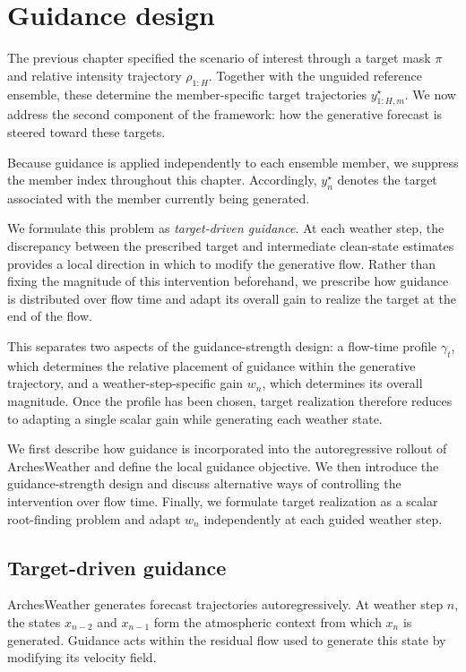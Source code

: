 \chapter{Guidance design}
\label{ch:guide}

The previous chapter specified the scenario of interest through a target mask
$\pi$ and relative intensity trajectory $\rho_{1:H}$. Together with the
unguided reference ensemble, these determine the member-specific target
trajectories $y^\star_{1:H,m}$. We now address the second component of the
framework: how the generative forecast is steered toward these targets.

Because guidance is applied independently to each ensemble member, we suppress
the member index throughout this chapter. Accordingly, $y_n^\star$ denotes the
target associated with the member currently being generated.

We formulate this problem as \emph{target-driven guidance}. At each weather
step, the discrepancy between the prescribed target and intermediate
clean-state estimates provides a local direction in which to modify the
generative flow. Rather than fixing the magnitude of this intervention
beforehand, we prescribe how guidance is distributed over flow time and adapt
its overall gain to realize the target at the end of the flow.

This separates two aspects of the guidance-strength design: a flow-time profile
$\gamma_t$, which determines the relative placement of guidance within the
generative trajectory, and a weather-step-specific gain $w_n$, which determines
its overall magnitude. Once the profile has been chosen, target realization
therefore reduces to adapting a single scalar gain while generating each
weather state.

We first describe how guidance is incorporated into the autoregressive rollout of ArchesWeather and define the local guidance objective. We then
introduce the guidance-strength design and discuss alternative ways of
controlling the intervention over flow time. Finally, we formulate target
realization as a scalar root-finding problem and adapt $w_n$ independently at
each guided weather step.
\section{Target-driven guidance}
\label{sec:target-driven-guidance}

ArchesWeather generates forecast trajectories autoregressively. At weather
step $n$, the states $x_{n-2}$ and $x_{n-1}$ form the atmospheric context from
which $x_n$ is generated. Guidance acts within the residual flow used to
generate this state by modifying its velocity field.

